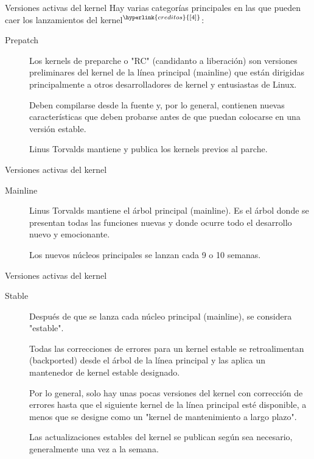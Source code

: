 \begin{frame}[c]{Versiones activas del kernel}
  Hay varias categorías principales en las que pueden caer los
  lanzamientos del kernel$^{\hyperlink{creditos}{[4]}}$:

  \vspace{\baselineskip}
  \begin{description}
    \item[Prepatch] Los kernels de preparche o "RC" (candidanto a
      liberación) son versiones preliminares del kernel de la línea principal
      (mainline) que están dirigidas principalmente a otros desarrolladores
      de kernel y entusiastas de Linux.

      \vspace{\baselineskip}
      Deben compilarse desde la fuente y, por lo general, contienen nuevas
      características que deben probarse antes de que puedan colocarse en
      una versión estable.

      \vspace{\baselineskip}
      Linus Torvalds mantiene y publica los kernels previos al parche. 
  \end{description}
\end{frame}

\begin{frame}[c]{Versiones activas del kernel}
  \begin{description}
    \item[Mainline] Linus Torvalds mantiene el árbol principal (mainline).
      Es el árbol donde se presentan todas las funciones nuevas y donde
      ocurre todo el desarrollo nuevo y emocionante.

      \vspace{\baselineskip}
      Los nuevos núcleos principales se lanzan cada 9 o 10 semanas. 
  \end{description}
\end{frame}

\begin{frame}[c]{Versiones activas del kernel}
  \begin{description}
    \item[Stable] Después de que se lanza cada núcleo principal (mainline),
      se considera "estable".

      \vspace{\baselineskip}
      Todas las correcciones de errores para un kernel estable se
      retroalimentan (backported) desde el árbol de la línea principal
      y las aplica un mantenedor de kernel estable designado.

      \vspace{\baselineskip}
      Por lo general, solo hay unas pocas versiones del kernel con corrección
      de errores hasta que el siguiente kernel de la línea principal esté
      disponible, a menos que se designe como un
      "kernel de mantenimiento a largo plazo".

      \vspace{\baselineskip}
      Las actualizaciones estables del kernel se publican según sea
      necesario, generalmente una vez a la semana. 
  \end{description}
\end{frame}

